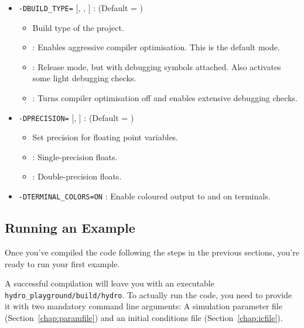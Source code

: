 \begin{itemize}
\item \verb|-DBUILD_TYPE=| [, , ] :
    (Default = )
    \begin{itemize}
        \item Build type of the project.
        \item  {}: Enables aggressive compiler optimisation. This
                is the default mode.
        \item  {}: Release mode, but with debugging symbols
                attached. Also activates some light debugging checks.
        \item  {}: Turns compiler optimisation off and enables
                extensive debugging checks.
    \end{itemize}

\item \verb|-DPRECISION=| [, ] :
    (Default = )
    \begin{itemize}
        \item Set precision for floating point variables.
        \item  {}: Single-precision floats.
        \item  {}: Double-precision floats.
    \end{itemize}

\item \verb|-DTERMINAL_COLORS=ON| : Enable coloured output to  and  on terminals.

\end{itemize}








\subsection{Running an Example}


Once you've compiled the code following the steps in the previous sections,
you're ready to run your first example.

A successful compilation will leave you with an executable
\verb|hydro_playground/build/hydro|. To actually run the code, you need to
provide it with two mandatory command line arguments: A simulation parameter
file (Section~\ref{chap:paramfile}) and an initial conditions file
(Section~\ref{chap:icfile}).

